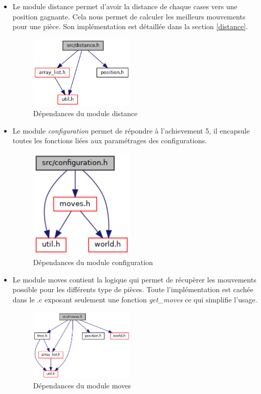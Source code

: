 \begin{itemize}
    \item Le module distance permet d'avoir la distance de chaque cases vers une position gagnante.
    Cela nous permet de calculer les meilleurs mouvements pour une pièce.
    Son implémentation est détaillée dans la section \ref{distance}. 
    
    \begin{figure}[H]
        \centering \includegraphics[width=5cm]{images/distance_8h__incl.png}
        \caption{Dépendances du module distance}
        \label{fig:dep-distance}
    \end{figure}

    \item  Le module \emph{configuration} permet de répondre à l'achievement 5, il encapsule toutes les fonctions
    liées aux paramétrages des configurations. 
    \begin{figure}[H]
        \centering \includegraphics[width=5cm]{images/configuration_8h__incl.png}
        \caption{Dépendances du module configuration}
        \label{fig:dep-config}
    \end{figure}

    \item Le module moves contient la logique qui permet de récupèrer les mouvements possible pour
    les différents type de pièces. Toute l'implémentation est cachée dans le .c exposant seulement une fonction
    \emph{get\_moves} ce qui simplifie l'usage.
    \begin{figure}[H]
        \centering \includegraphics[width=5cm]{images/moves_8h__incl.png}
        \caption{Dépendances du module moves}
        \label{fig:dep-moves}
    \end{figure}


\end{itemize}
